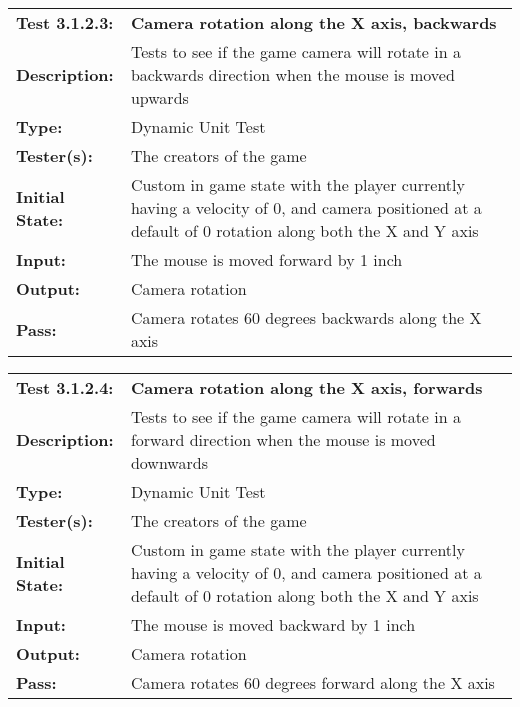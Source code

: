 \documentclass[12pt, titlepage]{article}
\begin{document}
\begin{mdframed}[linewidth=1pt]
\begin{tabularx}{\textwidth}{@{}p{3cm}X@{}}
{\bf Test 3.1.2.3:} & {\bf Camera rotation along the X axis, backwards}\\[\baselineskip]
{\bf Description:} & Tests to see if the game camera will rotate in a backwards direction when the mouse is moved upwards\\[0.5\baselineskip]
{\bf Type:} & Dynamic Unit Test\\[0.5\baselineskip]
{\bf Tester(s):} & The creators of the game\\[0.5\baselineskip]
{\bf Initial State:} & Custom in game state with the player currently having a velocity of 0, and camera positioned at a default of 0 rotation along both the X and Y axis\\[0.5\baselineskip]
{\bf Input:} & The mouse is moved forward by 1 inch\\[0.5\baselineskip]
{\bf Output:} & Camera rotation\\[0.5\baselineskip]
{\bf Pass:} & Camera rotates 60 degrees backwards along the X axis
\end{tabularx}
\end{mdframed}

\begin{mdframed}[linewidth=1pt]
\begin{tabularx}{\textwidth}{@{}p{3cm}X@{}}
{\bf Test 3.1.2.4:} & {\bf Camera rotation along the X axis, forwards}\\[\baselineskip]
{\bf Description:} & Tests to see if the game camera will rotate in a forward direction when the mouse is moved downwards\\[0.5\baselineskip]
{\bf Type:} & Dynamic Unit Test\\[0.5\baselineskip]
{\bf Tester(s):} & The creators of the game\\[0.5\baselineskip]
{\bf Initial State:} & Custom in game state with the player currently having a velocity of 0, and camera positioned at a default of 0 rotation along both the X and Y axis\\[0.5\baselineskip]
{\bf Input:} & The mouse is moved backward by 1 inch\\[0.5\baselineskip]
{\bf Output:} & Camera rotation\\[0.5\baselineskip]
{\bf Pass:} & Camera rotates 60 degrees forward along the X axis
\end{tabularx}
\end{mdframed}
\end{document}
